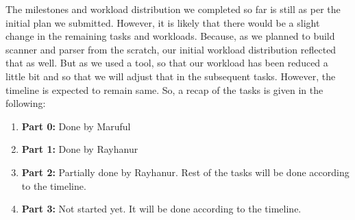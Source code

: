 \documentclass[sigplan]{acmart}\settopmatter{printfolios=true,printccs=false,printacmref=false}
\begin{document}
The milestones and workload distribution we completed so far is still as per the initial plan we submitted. However, it is likely that there would be a slight change in the remaining tasks and workloads. Because, as we planned to build scanner and parser from the scratch, our initial workload distribution reflected that as well. But as we used a tool, so that our workload has been reduced a little bit and so that we will adjust that in the subsequent tasks. However, the timeline is expected to remain same. So, a recap of the tasks is given in the following:
\begin{enumerate}
	\item \textbf{Part 0:} Done by Maruful
	\item \textbf{Part 1:} Done by Rayhanur
	\item \textbf{Part 2:} Partially done by Rayhanur. Rest of the tasks will be done according to the timeline. 
	\item \textbf{Part 3:} Not started yet. It will be done according to the timeline.
\end{enumerate} 







%
%
%
%
\end{document}
